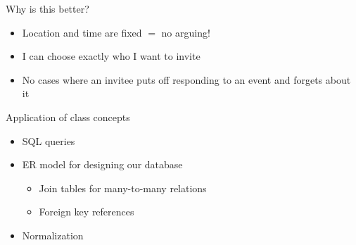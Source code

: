 \documentclass[pdf]{beamer}
\begin{document}
\begin{frame}{Why is this better?}
\begin{itemize}
    \item Location and time are fixed $=$ no arguing!
    \item I can choose exactly who I want to invite
    \item No cases where an invitee puts off responding to an event and forgets
    about it
\end{itemize}
\end{frame}

\begin{frame}{Application of class concepts}
\begin{itemize}
    \item SQL queries
    \item ER model for designing our database
    \begin{itemize}
        \item Join tables for many-to-many relations
        \item Foreign key references
    \end{itemize}
    \item Normalization
\end{itemize}
\end{frame}
\end{document}
